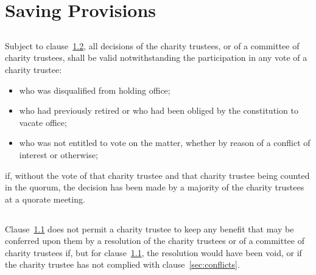 \section{Saving Provisions}\label{sec:saving}

    \subsection{}\label{sec:invalid_voters}
    Subject to clause~\ref{sec:invalid_benefits}, all decisions of the charity trustees, or of a committee of charity trustees, shall be valid notwithstanding the participation in any vote of a charity trustee:
    \begin{itemize}
        \item who was disqualified from holding office;
        \item who had previously retired or who had been obliged by the constitution to vacate office;
        \item who was not entitled to vote on the matter, whether by reason of a conflict of interest or otherwise;
    \end{itemize}
    if, without the vote of that charity trustee and that charity trustee being counted in the quorum, the decision has been made by a majority of the charity trustees at a quorate meeting.

    \subsection{}\label{sec:invalid_benefits}
    Clause~\ref{sec:invalid_voters} does not permit a charity trustee to keep any benefit that may be conferred upon them by a resolution of the charity trustees or of a committee of charity trustees if, but for clause~\ref{sec:invalid_voters}, the resolution would have been void, or if the charity trustee has not complied with clause~\ref{sec:conflicts}.

